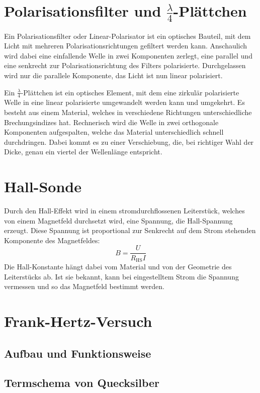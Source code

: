 \section{Polarisationsfilter und $\frac{\lambda}4$-Plättchen}

Ein Polarisationsfilter oder Linear-Polarisator ist ein optisches Bauteil, mit
dem Licht mit mehreren Polarisationsrichtungen gefiltert werden kann.
Anschaulich wird dabei eine einfallende Welle in zwei Komponenten zerlegt, eine
parallel und eine senkrecht zur Polarisationsrichtung des Filters polarisierte.
Durchgelassen wird nur die parallele Komponente, das Licht ist nun linear
polarisiert.

Ein $\frac\lambda4$-Plättchen ist ein optisches Element, mit dem eine zirkulär
polarisierte Welle in eine linear polarisierte umgewandelt werden kann und
umgekehrt. Es besteht aus einem Material, welches in verschiedene Richtungen
unterschiedliche Brechungsindizes hat. Rechnerisch wird die Welle in zwei
orthogonale Komponenten aufgespalten, welche das Material unterschiedlich
schnell durchdringen. Dabei kommt es zu einer Verschiebung, die, bei richtiger
Wahl der Dicke, genau ein viertel der Wellenlänge entspricht.

\section{Hall-Sonde}

Durch den Hall-Effekt wird in einem stromdurchflossenen Leiterstück, welches
von einem Magnetfeld durchsetzt wird, eine Spannung, die Hall-Spannung erzeugt.
Diese Spannung ist proportional zur Senkrecht auf dem Strom stehenden
Komponente des Magnetfeldes:
\[
    B = \frac{U}{R_\text{HS}I}
\]
Die Hall-Konstante hängt dabei vom Material und von der Geometrie des
Leiterstücks ab. Ist sie bekannt, kann bei eingestelltem Strom die Spannung
vermessen und so das Magnetfeld bestimmt werden.

\section{Frank-Hertz-Versuch}

\subsection{Aufbau und Funktionsweise}

\subsection{Termschema von Quecksilber}

